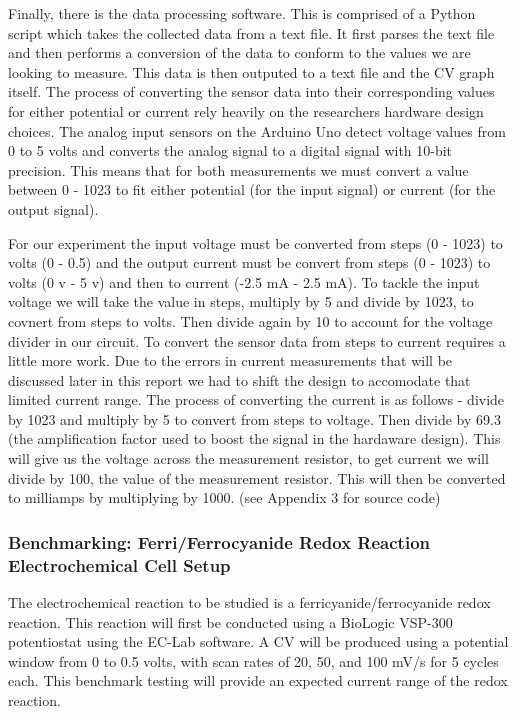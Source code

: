 \documentclass{article}
\begin{document}
Finally, there is the data processing software. This is comprised of a Python script which takes the collected data from a text file. It first parses the text file and then performs a conversion of the data to conform to the values we are looking to measure. This data is then outputed to a text file and the CV graph itself. The process of converting the sensor data into their corresponding values for either potential or current rely heavily on the researchers hardware design choices. The analog input sensors on the Arduino Uno detect voltage values from 0 to 5 volts and converts the analog signal to a digital signal with 10-bit precision. This means that for both measurements we must convert a value between 0 - 1023 to fit either potential (for the input signal) or current (for the output signal). 

For our experiment the input voltage must be converted from steps (0 - 1023) to volts (0 - 0.5) and the output current must be convert from steps (0 - 1023) to volts (0 v - 5 v) and then to current (-2.5 mA - 2.5 mA). To tackle the input voltage we will take the value in steps, multiply by 5 and divide by 1023, to covnert from steps to volts. Then divide again by 10 to account for the voltage divider in our circuit. To convert the sensor data from steps to current requires a little more work. Due to the errors in current measurements that will be discussed later in this report we had to shift the design to accomodate that limited current range. The process of converting the current is as follows - divide by 1023 and multiply by 5 to convert from steps to voltage. Then divide by 69.3 (the amplification factor used to boost the signal in the hardaware design). This will give us the voltage across the measurement resistor, to get current we will divide by 100, the value of the measurement resistor. This will then be converted to milliamps by multiplying by 1000. (see Appendix 3 for source code) 



\subsubsection*{Benchmarking: Ferri/Ferrocyanide Redox Reaction Electrochemical Cell Setup}

The electrochemical reaction to be studied is a ferricyanide/ferrocyanide redox reaction. This reaction will first be conducted using a BioLogic VSP-300 potentiostat using the EC-Lab software. A CV will be produced using a potential window from 0 to 0.5 volts, with scan rates of 20, 50, and 100 mV/s for 5 cycles each. This benchmark testing will provide an expected current range of the redox reaction. 
\end{document}
